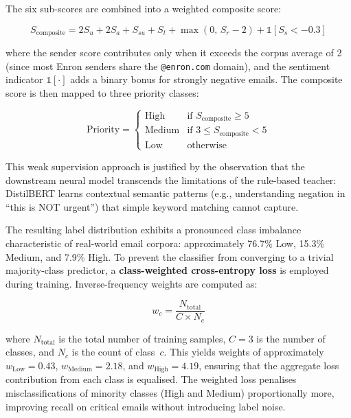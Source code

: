 \documentclass[3p,times,procedia]{elsarticle}
\begin{document}
The six sub-scores are combined into a weighted composite score:

\begin{equation}
S_{\text{composite}} = 2 S_u + 2 S_a + S_{su} + S_t + \max(0,\, S_r - 2) + \mathbb{1}[S_s < -0.3]
\label{eq:composite}
\end{equation}

\noindent where the sender score contributes only when it exceeds the corpus average of 2 (since most Enron senders share the \texttt{@enron.com} domain), and the sentiment indicator $\mathbb{1}[\cdot]$ adds a binary bonus for strongly negative emails. The composite score is then mapped to three priority classes:

\begin{equation}
\text{Priority} = 
\begin{cases}
\text{High}   & \text{if } S_{\text{composite}} \geq 5 \\
\text{Medium}  & \text{if } 3 \leq S_{\text{composite}} < 5 \\
\text{Low}     & \text{otherwise}
\end{cases}
\label{eq:labeling}
\end{equation}

This weak supervision approach is justified by the observation that the downstream neural model transcends the limitations of the rule-based teacher: DistilBERT learns contextual semantic patterns (e.g., understanding negation in ``this is NOT urgent'') that simple keyword matching cannot capture.

The resulting label distribution exhibits a pronounced class imbalance characteristic of real-world email corpora: approximately 76.7\% Low, 15.3\% Medium, and 7.9\% High. To prevent the classifier from converging to a trivial majority-class predictor, a \textbf{class-weighted cross-entropy loss} is employed during training. Inverse-frequency weights are computed as:

\begin{equation}
w_c = \frac{N_{\text{total}}}{C \times N_c}
\label{eq:classweights}
\end{equation}

\noindent where $N_{\text{total}}$ is the total number of training samples, $C = 3$ is the number of classes, and $N_c$ is the count of class~$c$. This yields weights of approximately $w_{\text{Low}} = 0.43$, $w_{\text{Medium}} = 2.18$, and $w_{\text{High}} = 4.19$, ensuring that the aggregate loss contribution from each class is equalised. The weighted loss penalises misclassifications of minority classes (High and Medium) proportionally more, improving recall on critical emails without introducing label noise.
\end{document}
